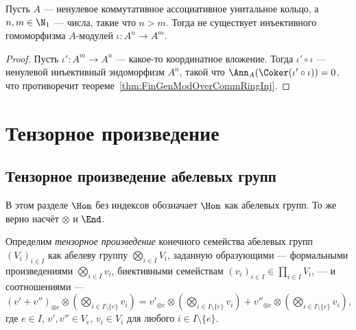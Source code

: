 \documentclass[
	extrafontsizes,
	11pt,
	hyphens,
]{memoir}
\begin{document}
\begin{corollary}
Пусть \(A\) --- ненулевое коммутативное ассоциативное унитальное кольцо, а \(n, m \in \N_1\) --- числа, такие что \(n > m\). Тогда не существует инъективного гомоморфизма \(A\)-модулей \(\iota : A^n \to A^m\).
\end{corollary}

\begin{proof}
Пусть \(\iota' : A^m \to A^n\) --- какое-то координатное вложение. Тогда \(\iota' \circ \iota\) --- ненулевой инъективный эндоморфизм \(A^n\),
такой что \(\Ann_A(\Coker(\iota' \circ \iota)) = 0\),
что противоречит теореме~\ref{thm:FinGenModOverCommRingInj}.
\end{proof}



\section{Тензорное произведение}

\subsection{Тензорное произведение абелевых групп}

\begin{notation}
В этом разделе \(\Hom\) без индексов обозначает \(\Hom\) как абелевых групп. То же верно насчёт \(\otimes\) и \(\End\).
\end{notation}

\begin{definition} \label{def:AbTensorProd}
Определим \emph{тензорное произведение} конечного семейства абелевых групп \((V_i)_{i \in I}\) как абелеву группу \(\bigotimes_{i \in I} V_i\),
заданную образующими --- формальными произведениями \(\bigotimes_{i \in I} v_i\),
биективными семействам \((v_i)_{i \in I} \in \prod_{i \in I} V_i\),
--- и соотношениями ---
\(
\textstyle
(v' + v'')_{\otimes e} \otimes (\bigotimes_{i \in I \setminus \{e\}} v_i) =
v'_{\otimes e} \otimes (\bigotimes_{i \in I \setminus \{e\}} v_i) +
v''_{\otimes e} \otimes (\bigotimes_{i \in I \setminus \{e\}} v_i),
\)
где \(e \in I\),
\(v', v'' \in V_e\),
\(v_i \in V_i\) для любого \(i \in I \setminus \{e\}\).
\end{definition}
\end{document}
